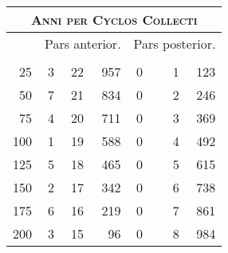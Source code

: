 %
\begin{tabnums} %
\footnotesize
\centering
\setlength{\tabcolsep}{1.0ex}
\renewcommand{\arraystretch}{0.98}
%
\newcommand{\cwd}{3.2em}
\newcommand{\da}{{\tiny †}}
\newcommand{\db}{{\scriptsize o}}
\newcommand{\ang}{90}
\newcommand{\hsb}[1]{\footnotesize{#1}}
\newcommand{\hsa}[1]{\tiny{#1}}
%
\newcommand{\hdrB}{%
  ~ &
  \multicolumn{3}{c}{\hsb{Pars anterior.}} &
  \multicolumn{4}{c}{\hsb{Pars posterior.}}  
}
%
\newcommand{\hdrA}{%
  \ch{\hsa{Anni per}}{\hsa{Anni per cyclos collecti.}} &
  \ch{\hsa{Feria.}}{\hsa{Feria.}}&
  \ch{\hsa{Hor.}}{\hsa{Hor.}} &
  \ch{\hsa{Scrup.}}{\hsa{Scrup.}} &
  \ch{\hsa{Dies.}}{\hsa{Dies.}} & & %
  \ch{\hsa{Hor.}}{\hsa{Hor.}} &
  \ch{\hsa{Scrup.}}{\hsa{Scrup.}}
}
%
\newcommand{\hdrs}{%
\hdrB \\
\cmidrule(lr){2-4} \cmidrule(lr){5-8}
\hdrA \\
}
%
\begin{tabular}[c]{@{} r rrr r@{}lrr @{}}
\toprule
\multicolumn{8}{c}{\normalsize\textsc{Anni per Cyclos Collecti}} \\
\toprule
\hdrs %
\midrule
  25 & 3 & 22 &  957 & 0&&  1 &  123 \\
  50 & 7 & 21 &  834 & 0&&  2 &  246 \\
  75 & 4 & 20 &  711 & 0&&  3 &  369 \\
 100 & 1 & 19 &  588 & 0&&  4 &  492 \\
 125 & 5 & 18 &  465 & 0&&  5 &  615 \\
 150 & 2 & 17 &  342 & 0&&  6 &  738 \\
 175 & 6 & 16 &  219 & 0&&  7 &  861 \\
 200 & 3 & 15 &   96 & 0&&  8 &  984 \\

\end{tabular}
\end{tabnums}
